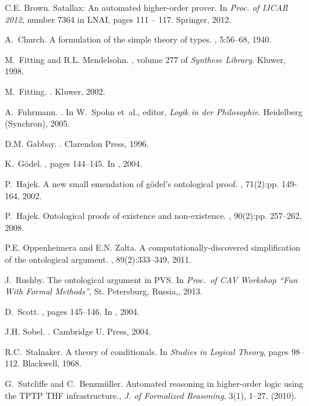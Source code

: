 \documentclass{llncs}
\begin{document}
\begin{thebibliography}{10}
C.E. Brown.
\newblock Satallax: An automated higher-order prover.
\newblock In {\em Proc. of IJCAR 2012}, number 7364 in LNAI, pages 111 -- 117.
  Springer, 2012.


A.~Church.
\newblock A formulation of the simple theory of types.
, 5:56--68, 1940.

M.~Fitting and R.L. Mendelsohn.
, volume 277 of {\em Synthese Library}.
\newblock Kluwer, 1998.

M.~Fitting.
.
\newblock Kluwer, 2002.

A.~Fuhrmann.
.
\newblock In W.~Spohn et~al., editor, {\em Logik in der Philosophie}.
  Heidelberg (Synchron), 2005.

D.M. Gabbay.
.
\newblock Clarendon Press, 1996.

K.~G\"odel.
, pages 144--145.
\newblock In  \cite{sobel2004logic}, 2004.

P.~Hajek.
\newblock A new small emendation of g\"odel's ontological proof.
,
  71(2):pp. 149-164, 2002.

P.~Hajek.
\newblock Ontological proofs of existence and non-existence.
,
  90(2):pp. 257--262, 2008.

P.E. Oppenheimera and E.N. Zalta.
\newblock A computationally-discovered simplification of the ontological
  argument.
, 89(2):333--349, 2011.

J.~Rushby.
\newblock The ontological argument in {PVS}.
\newblock In {\em Proc.~of CAV Workshop ``Fun With Formal Methods''}, St.
  Petersburg, Russia,, 2013.

D.~Scott.
, pages 145--146.
\newblock In  \cite{sobel2004logic}, 2004.

J.H. Sobel.
.
\newblock Cambridge U. Press, 2004.

R.C.~Stalnaker.
\newblock A theory of conditionals.
\newblock In {\em Studies in Logical Theory}, pages
98--112. Blackwell, 1968.

G.~Sutcliffe and C.~Benzm{\"u}ller.
\newblock Automated reasoning in higher-order logic
  using the {TPTP THF} infrastructure., {\em J. of Formalized Reasoning},
  3(1),  1--27, (2010).

\end{thebibliography}
\end{document}
